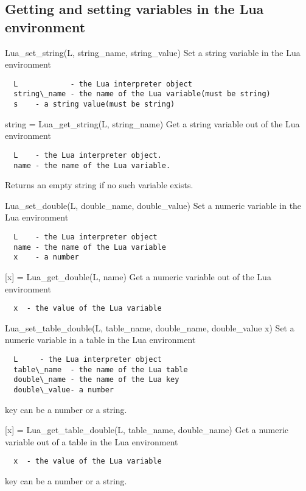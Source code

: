 \subsection{Getting and setting variables in the Lua environment}
\begin{codelist}

  \item[Lua\_set\_string(L, string\_name, string\_value)]
  Set a string variable in the Lua environment
\begin{verbatim}
  L            - the Lua interpreter object
  string\_name - the name of the Lua variable(must be string)
  s    - a string value(must be string)
\end{verbatim}

  \item[string = Lua\_get\_string(L, string\_name)]
  Get a string variable out of the Lua environment
\begin{verbatim}
  L    - the Lua interpreter object.
  name - the name of the Lua variable.
\end{verbatim}
  Returns an empty string if no such variable exists.

  \item[Lua\_set\_double(L, double\_name, double\_value)]
  Set a numeric variable in the Lua environment
\begin{verbatim}
  L    - the Lua interpreter object
  name - the name of the Lua variable
  x    - a number
\end{verbatim}

  \item[{[x]} = Lua\_get\_double(L, name)]
  Get a numeric variable out of the Lua environment
\begin{verbatim}
  x  - the value of the Lua variable   
\end{verbatim}

  \item[Lua\_set\_table\_double(L, table\_name, double\_name, double\_value x)]
  Set a numeric variable in a table in the Lua environment
\begin{verbatim}
  L     - the Lua interpreter object
  table\_name  - the name of the Lua table
  double\_name - the name of the Lua key
  double\_value- a number
\end{verbatim}
  key can be a number or a string.

  \item[{[x]} = Lua\_get\_table\_double(L, table\_name, double\_name)]
  Get a numeric variable out of a table in the Lua environment
\begin{verbatim}
  x  - the value of the Lua variable   
\end{verbatim}
  key can be a number or a string.


\end{codelist}
